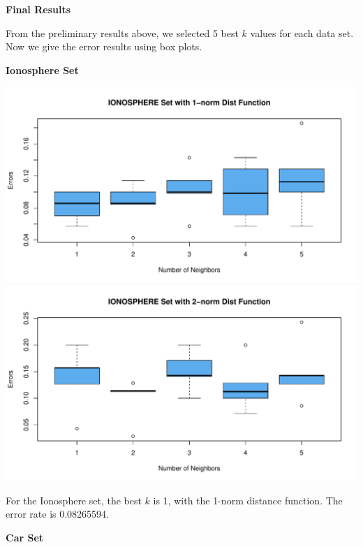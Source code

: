 \documentclass{article}
\begin{document}
\noindent\textbf{Final Results}
\bigskip

From the preliminary results above, we selected 5 best $k$ values for each data set. Now we give the error results using box plots.
\bigskip

\begin{center}
    \textcolor{mydarkgreen}{\textbf{\textsf{Ionosphere Set}}}
\end{center}


\begin{center}
    \includegraphics[width=0.9\linewidth]{Images/Prob2/Prob2-2-Iono-1norm.pdf}
    \includegraphics[width=0.9\linewidth]{Images/Prob2/Prob2-2-Iono-2norm.pdf}
\end{center}

For the Ionosphere set, the best $k$ is 1, with the 1-norm distance function. The error rate is 0.08265594.
\bigskip\bigskip

\begin{center}
    \textcolor{mydarkgreen}{\textbf{\textsf{Car Set}}}
\end{center}
\end{document}
